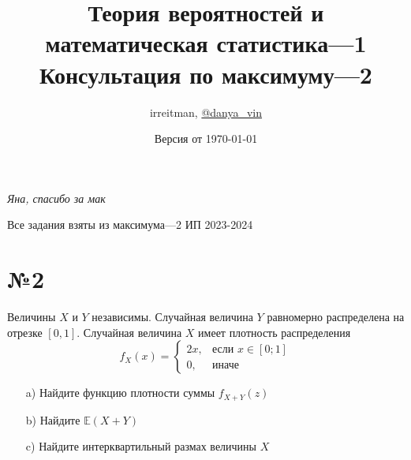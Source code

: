\documentclass{article}
\title{\LARGE{Теория вероятностей и математическая статистика—1}\\
Консультация по максимуму—2}
\author{irreitman, \href{https://t.me/danya_vin}{@danya\_vin}}
\date{Версия от \today}
\begin{document}
\maketitle
\begin{flushright}
    \textit{Яна, спасибо за мак}
\end{flushright}
\noindent Все задания взяты из максимума—2 ИП 2023-2024

\section*{№2}
\begin{tcolorbox}[colback=blue!20!white, colframe=black!100!black]
    Величины $X$ и $Y$ независимы. Случайная величина $Y$ равномерно распределена на отрезке $[0,1]$. Случайная величина $X$ имеет плотность распределения
    \begin{equation*}
        f_X(x)=\begin{cases}
        2 x,&\text {если } x \in[0 ; 1] \\
        0,&\text {иначе }
        \end{cases}
    \end{equation*}
    \begin{enumerate}
        \item[a)] Найдите функцию плотности суммы $f_{X+Y}(z)$
        \item[b)] Найдите $\mathbb{E}(X+Y)$
        \item[c)] Найдите интерквартильный размах величины $X$
    \end{enumerate}
\end{tcolorbox}
\end{document}
